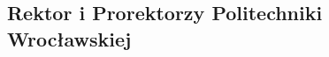 \documentclass[11pt]{article}
\begin{document}
\subsection{Rektor i Prorektorzy Politechniki Wrocławskiej}
\begin{center}
\end{center}
\end{document}
